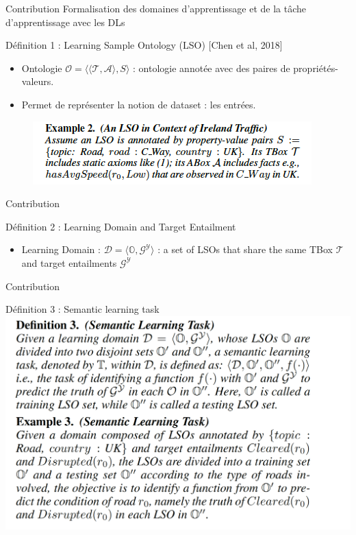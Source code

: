 \documentclass{beamer}
\begin{document}
\begin{frame}{Contribution}
Formalisation des domaines d'apprentissage et de la tâche d'apprentissage avec les DLs
\begin{block}{Définition 1 : Learning Sample Ontology (LSO) [Chen et al, 2018]}
\begin{itemize}
\item Ontologie $\mathcal{O} =\langle\langle \mathcal{T}, \mathcal{A} \rangle, S \rangle$ : ontologie annotée avec des paires de propriétés-valeurs.
\item Permet de représenter la notion de dataset : les entrées.
\end{itemize}
\end{block}
\begin{figure}
    \centering
    \includegraphics[scale=0.5]{Figures/LSO.png}
\end{figure}

\end{frame}

\begin{frame}{Contribution}
\begin{block}{Définition 2 : Learning Domain and Target Entailment}
\begin{itemize}
    \item Learning Domain : $\mathcal{D}=\langle \mathbb{O}, \mathcal{G}^{\mathcal{Y}} \rangle $ : a set of LSOs that share the same TBox $ \mathcal{T}$ and target entailments $\mathcal{G}^{\mathcal{Y}}$
\end{itemize}

\end{block}
\end{frame}


\begin{frame}{Contribution}
\begin{block}{Définition 3 : Semantic learning task}
 \centering
    \includegraphics[scale=0.3]{Figures/SLT.png}

\end{block}
\end{frame}
\end{document}
